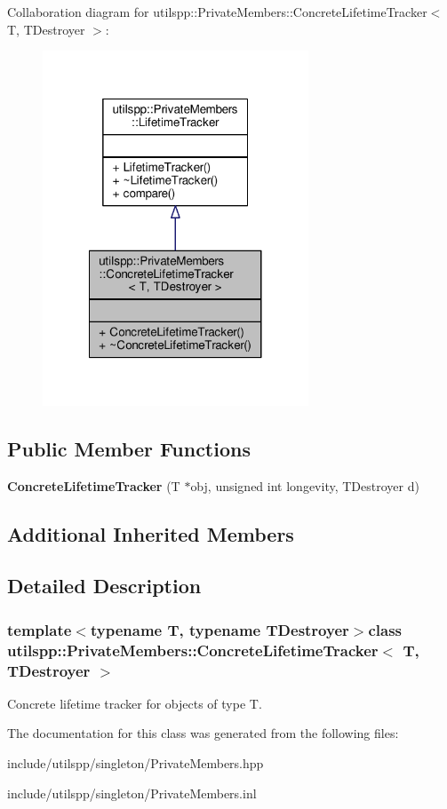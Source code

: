 Collaboration diagram for utilspp\-:\-:Private\-Members\-:\-:Concrete\-Lifetime\-Tracker$<$ T, T\-Destroyer $>$\-:\nopagebreak
\begin{figure}[H]
\begin{center}
\leavevmode
\includegraphics[width=224pt]{classutilspp_1_1PrivateMembers_1_1ConcreteLifetimeTracker__coll__graph}
\end{center}
\end{figure}
\subsection*{Public Member Functions}
\begin{DoxyCompactItemize}
\item 
\hypertarget{classutilspp_1_1PrivateMembers_1_1ConcreteLifetimeTracker_af560d6aa684c50ae7bfb533fd6ac739c}{{\bfseries Concrete\-Lifetime\-Tracker} (T $\ast$obj, unsigned int longevity, T\-Destroyer d)}\label{classutilspp_1_1PrivateMembers_1_1ConcreteLifetimeTracker_af560d6aa684c50ae7bfb533fd6ac739c}

\end{DoxyCompactItemize}
\subsection*{Additional Inherited Members}


\subsection{Detailed Description}
\subsubsection*{template$<$typename T, typename T\-Destroyer$>$class utilspp\-::\-Private\-Members\-::\-Concrete\-Lifetime\-Tracker$<$ T, T\-Destroyer $>$}

Concrete lifetime tracker for objects of type T. 

The documentation for this class was generated from the following files\-:\begin{DoxyCompactItemize}
\item 
include/utilspp/singleton/Private\-Members.\-hpp\item 
include/utilspp/singleton/Private\-Members.\-inl\end{DoxyCompactItemize}
